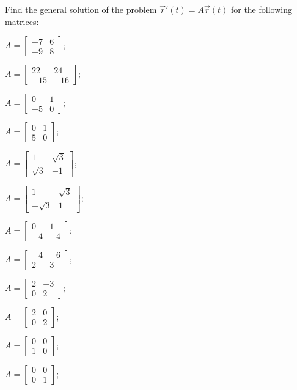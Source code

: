 \begin{exercises}

	\begin{problist}
	\prob Find the general solution of the problem $\vec{r}'(t) = A \vec{r}(t)$ for the following matrices:
	\begin{enumerate}
	\begin{minipage}{.2\textwidth}
		\item $A = \begin{bmatrix} -7 & 6 \\ -9 & 8 \end{bmatrix}$;
		\item $A = \begin{bmatrix} 22 & 24 \\ -15 & -16\end{bmatrix}$;
		\item $A = \begin{bmatrix} 0 & 1 \\ -5 & 0 \end{bmatrix}$;
		\item $A = \begin{bmatrix} 0 & 1 \\ 5 & 0 \end{bmatrix}$;
		\item $A = \begin{bmatrix} 1 & \sqrt{3} \\ \sqrt{3} & -1\end{bmatrix}$;
		\item $A = \begin{bmatrix} 1 & \sqrt{3} \\ -\sqrt{3} & 1\end{bmatrix}$;
	\end{minipage}
	\qquad
	\begin{minipage}{.2\textwidth}
		\item $A = \begin{bmatrix} 0 & 1 \\ -4 & -4 \end{bmatrix}$;
		\item $A = \begin{bmatrix} -4 & -6 \\ 2 & 3 \end{bmatrix}$;
		\item $A = \begin{bmatrix} 2 & -3 \\ 0 & 2 \end{bmatrix}$;
		\item $A = \begin{bmatrix} 2 & 0 \\ 0 & 2 \end{bmatrix}$;
		\item $A = \begin{bmatrix} 0 & 0 \\ 1 & 0\end{bmatrix}$; 
		\item $A = \begin{bmatrix} 0 & 0 \\ 0 & 1\end{bmatrix}$; 
	\end{minipage}
	\end{enumerate}


\end{problist}
\end{exercises}
